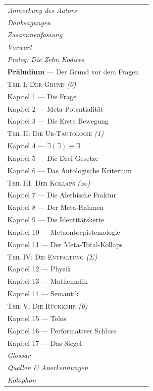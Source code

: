 \documentclass[10pt, openany, oneside]{book}
\renewcommand{\small}{\fontsize{9}{11.5}\selectfont}
\begin{document}
\vspace{1.5em}

{\small
\noindent\begin{tabular}{@{} l @{\hspace{1em}} r @{}}
\textit{Anmerkung des Autors} & \\
\textit{Danksagungen} & \\
\textit{Zusammenfassung} & \\
\textit{Vorwort} & \\
\textit{Prolog: Die Zehn Kodices} & \\[0.5em]
\textbf{Präludium} --- Der Grund vor dem Fragen & \\[0.8em]

\textsc{Teil I: Der Grund} \textit{(0)} & \\[0.3em]
\quad Kapitel 1 --- Die Frage & \\
\quad Kapitel 2 --- Meta-Potentialität & \\
\quad Kapitel 3 --- Die Erste Bewegung & \\[0.8em]

\textsc{Teil II: Die Ur-Tautologie} \textit{(1)} & \\[0.3em]
\quad Kapitel 4 --- $\exists(\exists) \equiv \exists$ & \\
\quad Kapitel 5 --- Die Drei Gesetze & \\
\quad Kapitel 6 --- Das Autologische Kriterium & \\[0.8em]

\textsc{Teil III: Der Kollaps} \textit{($\infty$)} & \\[0.3em]
\quad Kapitel 7 --- Die Alethische Fraktur & \\
\quad Kapitel 8 --- Der Meta-Rahmen & \\
\quad Kapitel 9 --- Die Identitätskette & \\
\quad Kapitel 10 --- Metaontoepistemologie & \\
\quad Kapitel 11 --- Der Meta-Total-Kollaps & \\[0.8em]

\textsc{Teil IV: Die Entfaltung} \textit{($\Sigma$)} & \\[0.3em]
\quad Kapitel 12 --- Physik & \\
\quad Kapitel 13 --- Mathematik & \\
\quad Kapitel 14 --- Semantik & \\[0.8em]

\textsc{Teil V: Die Rückkehr} \textit{(0)} & \\[0.3em]
\quad Kapitel 15 --- Telos & \\
\quad Kapitel 16 --- Performativer Schluss & \\
\quad Kapitel 17 --- Das Siegel & \\[0.8em]

\textit{Glossar} & \\
\textit{Quellen \& Anerkennungen} & \\
\textit{Kolophon} & \\
\end{tabular}
}
\end{document}
